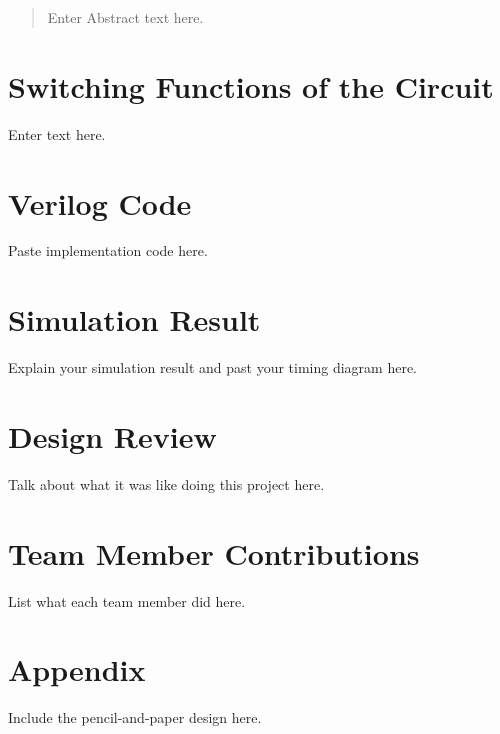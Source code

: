 \documentclass{article}
\begin{document}
\begin{abstract}
Enter Abstract text here.
\end{abstract}


\section{Switching Functions of the Circuit}

Enter text here.
 

\section{Verilog Code}

Paste implementation code here.


\section{Simulation Result}

Explain your simulation result and past your timing diagram here.


\section{Design Review}

Talk about what it was like doing this project here.


\section{Team Member Contributions}

List what each team member did here.


\section{Appendix}

Include the pencil-and-paper design here.

\end{document}
